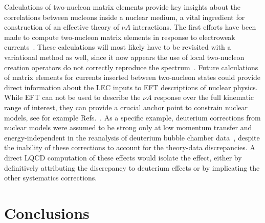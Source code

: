 \documentclass{ar-1col}
\begin{document}
Calculations of two-nucleon matrix elements provide key insights
 about the correlations between nucleons inside a nuclear medium,
 a vital ingredient for construction of an effective theory
 of $\nu A$ interactions.
The first efforts have been made to compute two-nucleon matrix elements in response to electroweak currents~\cite{Savage:2016kon,Chang:2017eiq}.
These calculations will most likely have to be revisited with a variational method as well,
 since it now appears the use of local two-nucleon creation operators do not correctly
 reproduce the spectrum~\cite{Francis:2018qch,Horz:2020zvv,Green:2021qol,Amarasinghe:2021lqa}.
Future calculations of matrix elements for currents inserted between
 two-nucleon states could provide direct information about the LEC inputs to EFT descriptions of nuclear physics.
While EFT can not be used to describe the $\nu A$ response over the full kinematic range of interest, they can provide a crucial anchor point to constrain nuclear models, see for example Refs.~\cite{Kronfeld:2019nfb,Drischler:2019xuo,Tews:2020hgp,Davoudi:2020ngi}.
As a specific example, deuterium corrections from nuclear models were assumed to be strong only at low momentum transfer
 and energy-independent in the reanalysis of deuterium bubble chamber data~\cite{Meyer:2016oeg},
 despite the inability of these corrections to account for the theory-data discrepancies.
A direct LQCD computation of these effects would isolate the effect,
 either by definitively attributing the discrepancy to deuterium effects
 or by implicating the other systematics corrections.


\section{Conclusions\label{sec:conclusions}}
\end{document}
